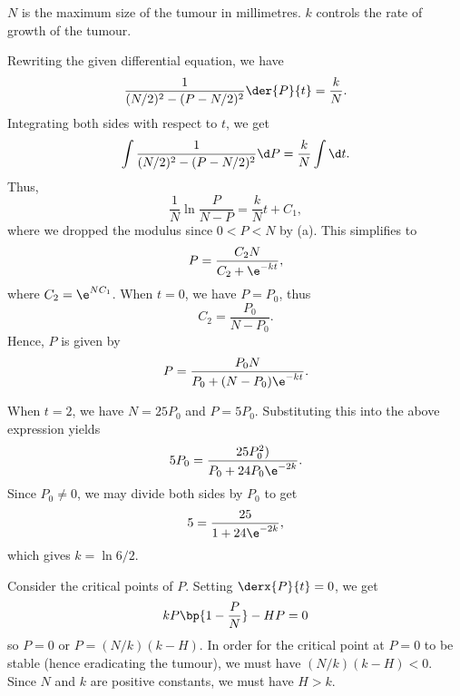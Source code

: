\begin{solution}
    \begin{ppart}
        $N$ is the maximum size of the tumour in millimetres. $k$ controls the rate of growth of the tumour.
    \end{ppart}
    \begin{ppart}
        Rewriting the given differential equation, we have \[\frac1{(N/2)^2 - (P - N/2)^2} \der{P}{t} = \frac{k}{N}.\] Integrating both sides with respect to $t$, we get \[\int \frac1{(N/2)^2 - (P - N/2)^2} \d P = \frac{k}{N} \int \d t.\] Thus, \[\frac1{N} \ln{\frac{P}{N-P}} = \frac{k}{N} t + C_1,\] where we dropped the modulus since $0 < P < N$ by (a). This simplifies to \[P = \frac{C_2 N}{C_2 + \e^{-kt}},\] where $C_2 = \e^{NC_1}$. When $t = 0$, we have $P = P_0$, thus \[C_2 = \frac{P_0}{N-P_0}.\] Hence, $P$ is given by \[P = \frac{P_0 N}{P_0 + (N - P_0) \e^{-kt}}.\]
    \end{ppart}
    \begin{ppart}
        When $t = 2$, we have $N = 25P_0$ and $P = 5P_0$. Substituting this into the above expression yields \[5P_0 = \frac{25P_0^2)}{P_0 + 24P_0\e^{-2k}}.\] Since $P_0 \neq 0$, we may divide both sides by $P_0$ to get \[5 = \frac{25}{1 + 24\e^{-2k}},\] which gives $k = \ln{6}/2$.
    \end{ppart}
    \begin{ppart}
        Consider the critical points of $P$. Setting $\derx{P}{t} = 0$, we get \[kP\bp{1 - \frac{P}{N}} - HP = 0\] so $P = 0$ or $P = (N/k) (k-H)$. In order for the critical point at $P = 0$ to be stable (hence eradicating the tumour), we must have $(N/k) (k-H) < 0$. Since $N$ and $k$ are positive constants, we must have $H > k$.
    \end{ppart}
\end{solution}

